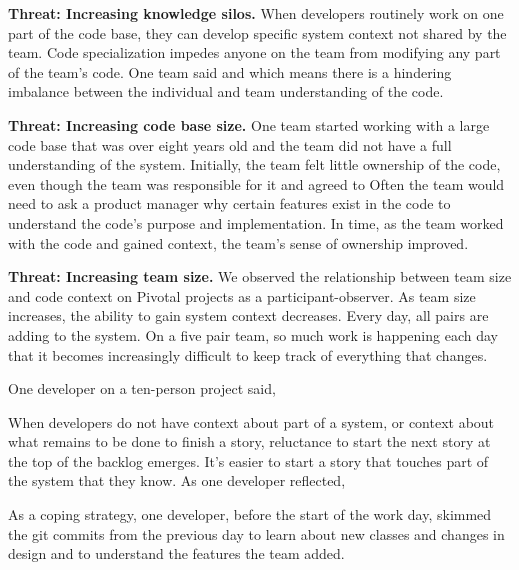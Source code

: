 \textbf{Threat: Increasing knowledge silos.} When developers routinely work on one part of the code base, they can develop specific system context not shared by the team. Code specialization impedes anyone on the team from modifying any part of the team's code.  One team said  and  which means there is a hindering imbalance between the individual and team understanding of the code.

\textbf{Threat: Increasing code base size.} One team started working with a large code base that was over eight years old and the team did not have a full understanding of the system. Initially, the team felt little ownership of the code, even though the team was responsible for it and agreed to  Often the team would need to ask a product manager why certain features exist in the code to understand the code's purpose and implementation. In time, as the team worked with the code and gained context, the team's sense of ownership improved.

\textbf{Threat: Increasing team size.} We observed the relationship between team size and code context on \numberOfObservedProjects{} Pivotal projects as a participant-observer. As team size increases, the ability to gain system context decreases. Every day, all pairs are adding to the system. On a five pair team, so much work is happening each day that it becomes increasingly difficult to keep track of everything that changes.

One developer on a ten-person project said, 

When developers do not have context about part of a system, or context about what remains to be done to finish a story, reluctance to start the next story at the top of the backlog emerges. It's easier to start a story that touches part of the system that they know. As one developer reflected, 

As a coping strategy, one developer, before the start of the work day, skimmed the git commits from the previous day to learn about new classes and changes in design and to understand the features the team added. 

